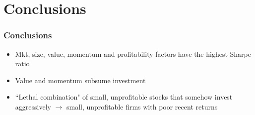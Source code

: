 \documentclass{beamer}
\begin{document}
\section{Conclusions}

\begin{frame}
\frametitle{Conclusions}
\begin{itemize}
    \item<1-> Mkt, size, value, momentum and profitability factors have the
    highest Sharpe ratio
    \item<2-> Value and momentum subsume investment
    \item<3-> ``Lethal combination" of small, unprofitable stocks that somehow
    invest aggressively $\rightarrow$ small, unprofitable firms with poor
    recent returns
\end{itemize}
\end{frame}


\end{document}
